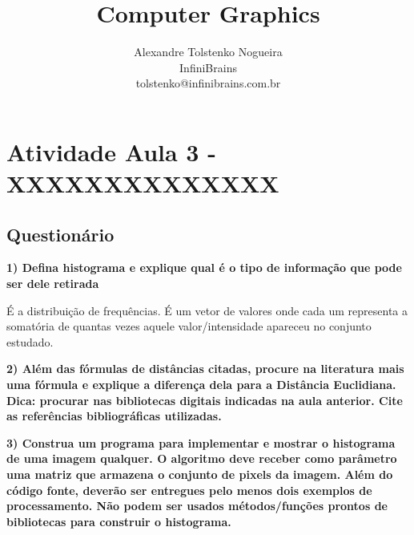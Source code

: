 \documentclass[a4paper]{sbgames}               %
\title{Computer Graphics}
\author{Alexandre Tolstenko Nogueira\\InfiniBrains\\tolstenko@infinibrains.com.br 
}
\begin{document}


\maketitle




\section{Atividade Aula 3 - XXXXXXXXXXXXXX}

\subsection*{Questionário}

\textbf{1) Defina histograma e explique qual é o tipo de informação que pode ser dele retirada}

É a distribuição de frequências. É um vetor de valores onde cada um representa a somatória de quantas vezes aquele valor/intensidade apareceu no conjunto estudado.

\textbf{2) Além das fórmulas de distâncias citadas, procure na literatura mais uma fórmula e explique a diferença dela para a Distância Euclidiana. Dica: procurar nas bibliotecas digitais indicadas na aula anterior. Cite as referências bibliográficas
utilizadas.
}

\textbf{3) Construa um programa para implementar e mostrar o histograma de uma imagem qualquer. O algoritmo deve receber como parâmetro uma matriz que armazena o conjunto de pixels da imagem. Além do código fonte, deverão ser entregues pelo menos dois exemplos de processamento. Não podem ser usados métodos/funções prontos de bibliotecas para construir o histograma.}
\end{document}
